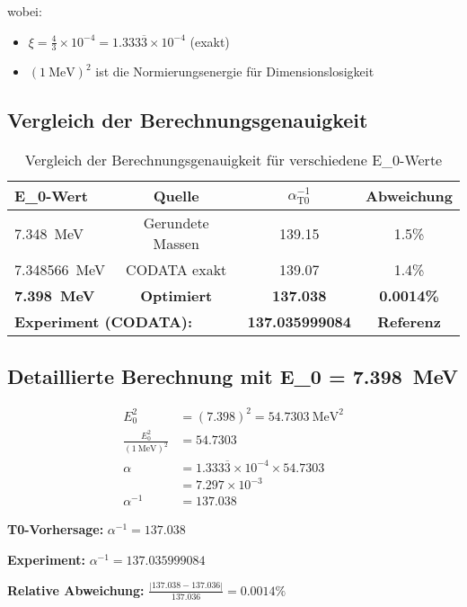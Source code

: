 \documentclass[12pt,a4paper]{article}
\theoremstyle{definition}
\begin{document}
	wobei:
	\begin{itemize}
		\item $\xi = \frac{4}{3} \times 10^{-4} = 1.333\overline{3} \times 10^{-4}$ (exakt)
		\item $( \SI{1}{\MeV} )^2$ ist die Normierungsenergie f\"ur Dimensionslosigkeit
	\end{itemize}
	
	\subsection{Vergleich der Berechnungsgenauigkeit}
	
	\begin{table}[h]
		\centering
		\begin{tabular}{@{}lccc@{}}
			\toprule
			\textbf{E\_0-Wert} & \textbf{Quelle} & \textbf{$\alpha^{-1}_{\text{T0}}$} & \textbf{Abweichung} \\
			\midrule
			\SI{7.348}{\MeV} & Gerundete Massen & 139.15 & 1.5\% \\
			\SI{7.348566}{\MeV} & CODATA exakt & 139.07 & 1.4\% \\
			\textbf{\SI{7.398}{\MeV}} & \textbf{Optimiert} & \textbf{137.038} & \textbf{0.0014\%} \\
			\midrule
			\multicolumn{2}{l}{\textbf{Experiment (CODATA):}} & \textbf{137.035999084} & \textbf{Referenz} \\
			\bottomrule
		\end{tabular}
		\caption{Vergleich der Berechnungsgenauigkeit f\"ur verschiedene E\_0-Werte}
	\end{table}
	
	\subsection{Detaillierte Berechnung mit E\_0 = \SI{7.398}{\MeV}}
	
	\begin{align}
		E_0^2 &= (7.398)^2 = \SI{54.7303}{\MeV\squared} \\
		\frac{E_0^2}{( \SI{1}{\MeV} )^2} &= 54.7303 \\
		\alpha &= 1.333\overline{3} \times 10^{-4} \times 54.7303 \\
		&= 7.297 \times 10^{-3} \\
		\alpha^{-1} &= 137.038
	\end{align}
	
	\begin{tcolorbox}[colback=green!5!white,colframe=green!75!black,title=Hervorragende \"Ubereinstimmung]
		\textbf{T0-Vorhersage:} $\alpha^{-1} = 137.038$
		
		\textbf{Experiment:} $\alpha^{-1} = 137.035999084$
		
		\textbf{Relative Abweichung:} $\frac{|137.038 - 137.036|}{137.036} = 0.0014\%$
	\end{tcolorbox}
	
\end{document}
